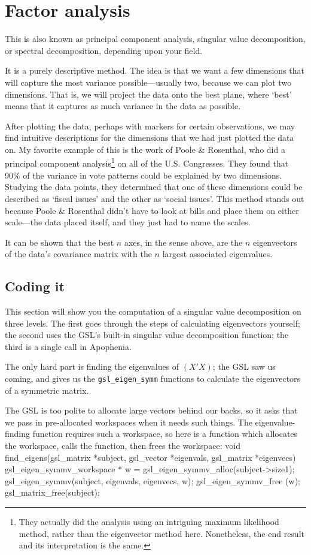 \section{Factor analysis} \label{pca} 
This is also known as principal component
analysis, singular value decomposition, or spectral decomposition, depending upon your field. 

It is a purely descriptive method.  The idea is that we want a few
dimensions that will capture the most variance possible---usually two,
because we can plot two dimensions. That is, we will project the data
onto the best plane, where `best' means that it captures as much
variance in the data as possible.

After plotting the data, perhaps with markers for certain observations,
we may find intuitive descriptions for the dimensions that we had just plotted the
data on. My favorite example of this is the work of Poole \& Rosenthal,
who did a principal component analysis\footnote{They actually did
the analysis using an intriguing maximum likelihood method, rather
than the eigenvector method here. Nonetheless, the end result and its
interpretation is the same.} on all of the U.S. Congresses. They found
that 90\% of the variance in vote patterns could be explained by two dimensions.
Studying the data points, they determined that one of these dimensions could be
described as `fiscal issues' and the other as `social issues'. This method stands
out because Poole \& Rosenthal didn't have to look at bills and place them on
either scale---the data placed itself, and they just had to name the scales.


It can be shown that the best $n$ axes, in the sense above, are the
$n$ eigenvectors of the data's covariance matrix with the $n$ largest
associated eigenvalues.

\subsection{Coding it}
This section will show you the computation of a singular value
decomposition on three levels. The first goes through the steps of
calculating eigenvectors yourself; the second uses the 
GSL's built-in singular value decomposition function; the third is a
single call in Apophenia.

The only hard part is finding the eigenvalues of
$(X'X)$; the GSL saw us coming, and gives us the {\tt gsl\_eigen\_symm} functions
to calculate the eigenvectors of a symmetric matrix.

The GSL is too polite to allocate large vectors behind our backs, so
it asks that we pass in pre-allocated workspaces when it needs such
things. The eigenvalue-finding function requires such a workspace, so
here is a function which allocates the workspace, calls the function,
then frees the workspace:
void find_eigens(gsl_matrix *subject, gsl_vector *eigenvals, 
                            gsl_matrix *eigenvecs){
   gsl_eigen_symmv_workspace * w 
                        = gsl_eigen_symmv_alloc(subject->size1);
   gsl_eigen_symmv(subject, eigenvals, eigenvecs, w);
   gsl_eigen_symmv_free (w);
   gsl_matrix_free(subject);
}

